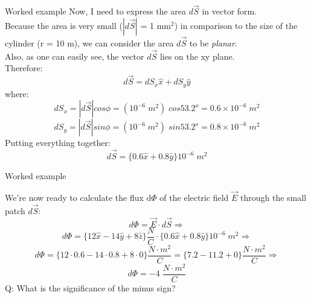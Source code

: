 {\begin{frame}{Worked example}
Now, I need to express the area $d\vec{S}$ in vector form.\\
\vspace{0.2cm}
Because the area is very small ($|d\vec{S}|$ = 1 mm$^2$) in comparison to the
size of the cylinder (r = 10 m), we can consider the area $d\vec{S}$ to be {\em planar}.\\
\vspace{0.1cm}
Also, as one can easily see, the vector $d\vec{S}$ lies on the xy plane.\\
\vspace{0.3cm}
Therefore:
\begin{equation*}
  d\vec{S} = dS_x \hat{x} + dS_y \hat{y}
\end{equation*}
where:
\begin{equation*}
   dS_x = |d\vec{S}| cos\phi = (10^{-6} \; m^2) \; cos53.2^o = 0.6 \times 10^{-6} \; m^2
\end{equation*}
\begin{equation*}
   dS_y = |d\vec{S}| sin\phi = (10^{-6} \; m^2) \; sin53.2^o = 0.8 \times 10^{-6} \; m^2
\end{equation*}
\vspace{0.2cm}
Putting everything together:
\begin{equation*}
  d\vec{S} = \big\{ 0.6 \hat{x} + 0.8 \hat{y} \big\} 10^{-6} \; m^2
\end{equation*}

\end{frame}

%
%
%

\begin{frame}{Worked example}

We're now ready to calculate the flux d$\Phi$ of the electric field $\vec{E}$
through the small patch $d\vec{S}$:\\
\vspace{0.2cm}
\begin{equation*}
  d\Phi = \vec{E} \cdot d\vec{S} \Rightarrow
\end{equation*}
\vspace{0.1cm}
\begin{equation*}
  d\Phi =
  \big\{ 12 \hat{x} - 14 \hat{y} + 8 \hat{z} \big\} \frac{N}{C}
   \cdot \big\{ 0.6 \hat{x} + 0.8 \hat{y} \big\} 10^{-6} \; m^2 \Rightarrow
\end{equation*}
\vspace{0.1cm}
\begin{equation*}
  d\Phi =
  \big\{ 12 \cdot 0.6 - 14 \cdot 0.8 + 8 \cdot 0 \big\} \frac{N \cdot m^2}{C} =
  \big\{ 7.2 - 11.2 + 0 \big\} \frac{N \cdot m^2}{C}
  \Rightarrow
\end{equation*}
\vspace{0.1cm}
\begin{equation*}
  d\Phi = -4 \; \frac{N \cdot m^2}{C}
\end{equation*}
\vspace{0.1cm}
Q: What is the significance of the minus sign?
\end{frame}


} %



